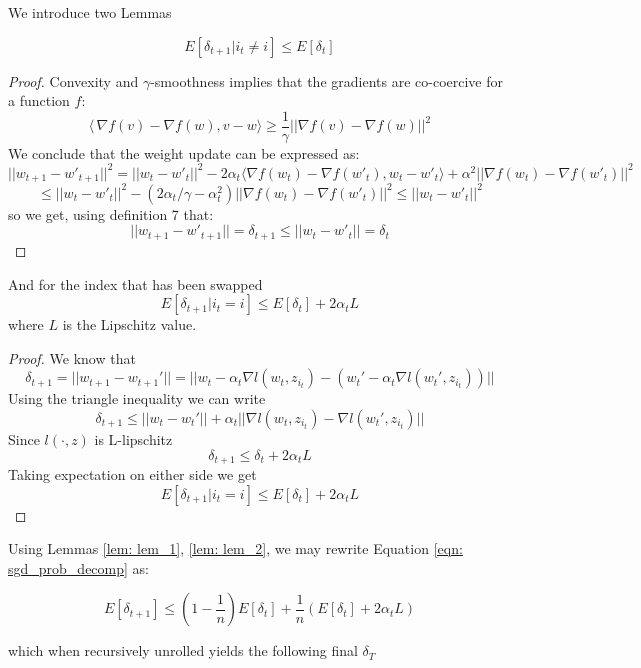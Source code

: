 \documentclass{article}
\begin{document}
We introduce two Lemmas
\begin{lemma} \label{lem: lem_1}
    \[
    E[\delta_{t+1} | i_t \neq i] \leq E[\delta_t]
    \]
\end{lemma}
\begin{proof}
Convexity and $\gamma$-smoothness implies that the gradients are co-coercive for a  function $f$: 
\[ 
\langle\,\nabla f(v)- \nabla f(w), v-w \rangle \geq \frac{1}{\gamma}||\nabla f(v)- \nabla f(w)||^2
\]
We conclude that the weight update can be expressed as:
    \[ 
    ||w_{t+1}-w'_{t+1}||^2 = ||w_t-w'_t||^2 - 2\alpha_t \langle \nabla f(w_t)- \nabla f(w'_t), w_t-w'_t \rangle +\alpha^2 ||\nabla f(w_t)- \nabla f(w'_t)||^2 \]
    \[
    \leq ||w_t-w'_t||^2 - (2 \alpha_t / \gamma - \alpha_t^2) ||\nabla f(w_t)- \nabla f(w'_t)||^2 \leq ||w_t-w'_t||^2
    \]
so we get, using definition 7 that:
    \[
    ||w_{t+1}-w'_{t+1}|| = \delta_{t+1} \leq ||w_{t}-w'_{t}|| = \delta_{t}
    \]
\end{proof}
\begin{lemma} \label{lem: lem_2} And for the index that has been swapped
    \[
    E[\delta_{t+1} | i_t = i] \leq E[\delta_t] + 2 \alpha_t L
    \]
where $L$ is the Lipschitz value.
\end{lemma}
\begin{proof}
We know that 
    \[\delta_{t+1}=||w_{t+1}-w_{t+1}'||=||w_t-\alpha_t \nabla l(w_t, z_{i_t}) - ( w_t'-\alpha_t \nabla l(w_t', z_{i_t}))||
    \]
Using the triangle inequality we can write
    \[\delta_{t+1} \leq ||w_t - w_t'|| + \alpha_t||\nabla l(w_t,z_{i_t}) - \nabla l(w_t',z_{i_t})||
    \]
Since $l(\cdot, z)$ is L-lipschitz
    \[\delta_{t+1} \leq \delta_t + 2\alpha_t L
    \]
Taking expectation on either side we get
    \[E[\delta_{t+1}|i_t=i] \leq E[\delta_t] + 2\alpha_t L
    \]
\end{proof}

  Using Lemmas \ref{lem: lem_1}, \ref{lem: lem_2}, we may rewrite Equation \ref{eqn: sgd_prob_decomp} as:

\begin{equation}
    E[\delta_{t+1}] \leq \left(1 - \frac{1}{n}\right)E[\delta_t] + \frac{1}{n} \left( E[\delta_t] + 2 \alpha_t L \right)
\end{equation}

which when recursively unrolled yields the following final $\delta_T$
\end{document}
